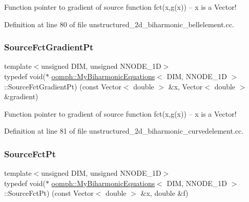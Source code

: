 Function pointer to gradient of source function fct(x,g(x)) -- x is a Vector! 



Definition at line 80 of file unstructured\+\_\+2d\+\_\+biharmonic\+\_\+bellelement.\+cc.

\mbox{\label{classoomph_1_1MyBiharmonicEquations_af007c03701e888fed7375cb4537f0046}} 
\subsubsection{\texorpdfstring{Source\+Fct\+Gradient\+Pt}{SourceFctGradientPt}\hspace{0.1cm}{\footnotesize\ttfamily [2/2]}}
{\footnotesize\ttfamily template$<$unsigned D\+IM, unsigned N\+N\+O\+D\+E\+\_\+1D$>$ \\
typedef void($\ast$ \hyperlink{classoomph_1_1MyBiharmonicEquations}{oomph\+::\+My\+Biharmonic\+Equations}$<$ D\+IM, N\+N\+O\+D\+E\+\_\+1D $>$\+::Source\+Fct\+Gradient\+Pt) (const Vector$<$ double $>$ \&x, Vector$<$ double $>$ \&gradient)}



Function pointer to gradient of source function fct(x,g(x)) -- x is a Vector! 



Definition at line 81 of file unstructured\+\_\+2d\+\_\+biharmonic\+\_\+curvedelement.\+cc.

\mbox{\label{classoomph_1_1MyBiharmonicEquations_a17bd58054c66229016eb1c52eab36bc1}} 
\subsubsection{\texorpdfstring{Source\+Fct\+Pt}{SourceFctPt}\hspace{0.1cm}{\footnotesize\ttfamily [1/2]}}
{\footnotesize\ttfamily template$<$unsigned D\+IM, unsigned N\+N\+O\+D\+E\+\_\+1D$>$ \\
typedef void($\ast$ \hyperlink{classoomph_1_1MyBiharmonicEquations}{oomph\+::\+My\+Biharmonic\+Equations}$<$ D\+IM, N\+N\+O\+D\+E\+\_\+1D $>$\+::Source\+Fct\+Pt) (const Vector$<$ double $>$ \&x, double \&f)}



